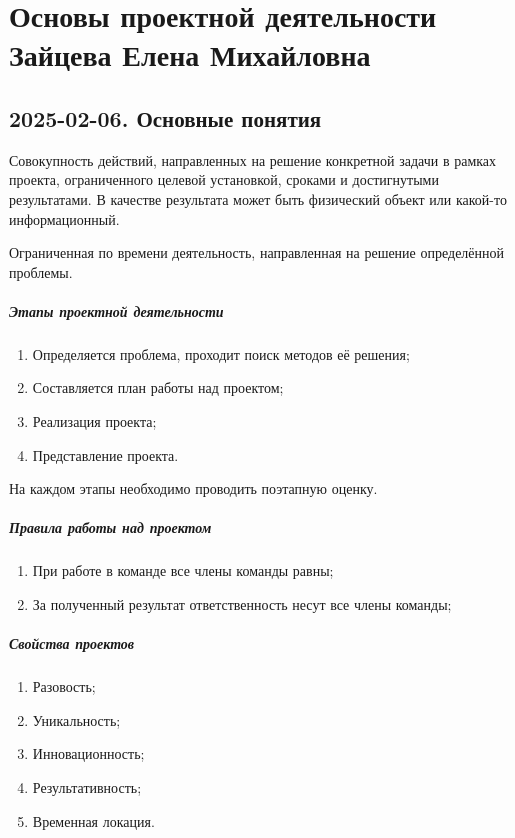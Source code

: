 \part[Основы проектной деятельности]{
Основы проектной деятельности \\
{\Large Зайцева Елена Михайловна}
}

\chapter{2025-02-06. Основные понятия}

\begin{definition}
	Совокупность действий, направленных на решение конкретной задачи в рамках
	проекта, ограниченного целевой установкой, сроками и достигнутыми
	результатами. В качестве результата может быть физический объект или какой-то
	информационный.
\end{definition}

\begin{definition}[Проект]
	Ограниченная по времени деятельность, направленная на решение определённой
	проблемы.
\end{definition}

\subsubsection{Этапы проектной деятельности}

\begin{enumerate}
	\item Определяется проблема, проходит поиск методов её решения;
	\item Составляется план работы над проектом;
	\item Реализация проекта;
	\item Представление проекта.
\end{enumerate}

На каждом этапы необходимо проводить поэтапную оценку.

\subsubsection{Правила работы над проектом}

\begin{enumerate}
	\item При работе в команде все члены команды равны;
	\item За полученный результат ответственность несут все члены команды;
\end{enumerate}

\subsubsection{Свойства проектов}

\begin{enumerate}
	\item Разовость;
	\item Уникальность;
	\item Инновационность;
	\item Результативность;
	\item Временная локация.
\end{enumerate}
